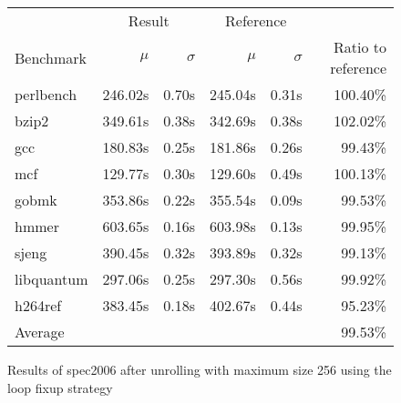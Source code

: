 \begin{figure}[h]
    \begin{center}
        \begin{tabular}{lrrrrr}
            \toprule
            & \multicolumn{2}{c}{Result} & \multicolumn{2}{c}{Reference}\\
            Benchmark & $\mu$ & $\sigma$ & $\mu$ & $\sigma$ & Ratio to reference\\
            \midrule
            perlbench & 246.02s & 0.70s & 245.04s & 0.31s & 100.40\%\\
            bzip2 & 349.61s & 0.38s & 342.69s & 0.38s & 102.02\%\\
            gcc & 180.83s & 0.25s & 181.86s & 0.26s & 99.43\%\\
            mcf & 129.77s & 0.30s & 129.60s & 0.49s & 100.13\%\\
            gobmk & 353.86s & 0.22s & 355.54s & 0.09s & 99.53\%\\
            hmmer & 603.65s & 0.16s & 603.98s & 0.13s & 99.95\%\\
            sjeng & 390.45s & 0.32s & 393.89s & 0.32s & 99.13\%\\
            libquantum & 297.06s & 0.25s & 297.30s & 0.56s & 99.92\%\\
            h264ref & 383.45s & 0.18s & 402.67s & 0.44s & 95.23\%\\
            \midrule
            Average & & & & & 99.53\%\\
            \bottomrule
        \end{tabular}
    \end{center}
    \caption{Results of spec2006 after unrolling with maximum size 256 using the loop fixup strategy}
    \label{fig:eval:perf:loop:256}
\end{figure}
